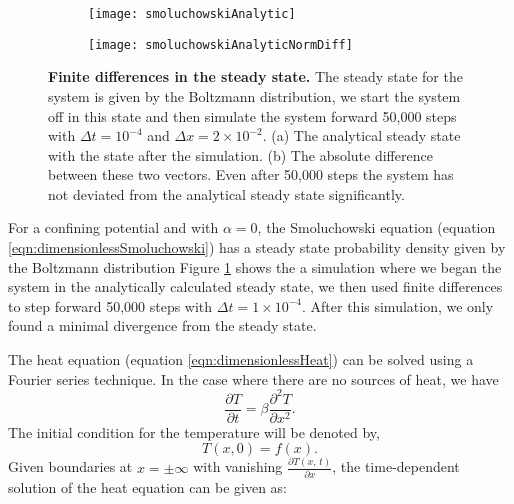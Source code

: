\begin{figure}
	\begin{subfigure}{0.49\textwidth}
	\texttt{[image: smoluchowskiAnalytic]}
	\end{subfigure}
	\begin{subfigure}{0.49\textwidth}
	\texttt{[image: smoluchowskiAnalyticNormDiff]}
	\end{subfigure}
	\caption{\textbf{Finite differences in the steady state.} The steady state for the system is given by the Boltzmann distribution, we start the system off in this state and then simulate the system forward 50,000 steps with $\Delta t = 10^{-4}$ and $\Delta x = 2 \times 10^{-2}$. (a) The analytical steady state with the state after the simulation. (b) The absolute difference between these two vectors. Even after 50,000 steps the system has not deviated from the analytical steady state significantly. \label{fig:smoluchowskiCompare}}
\end{figure}

For a confining potential and with $\alpha = 0$, the Smoluchowski equation (equation \ref{eqn:dimensionlessSmoluchowski}) has a steady state probability density given by the Boltzmann distribution
Figure \ref{fig:smoluchowskiCompare} shows the a simulation where we began the system in the analytically calculated steady state, we then used finite differences to step forward 50,000 steps with $\Delta t = 1 \times 10^{-4}$. After this simulation, we only found a minimal divergence from the steady state.

The heat equation (equation \ref{eqn:dimensionlessHeat}) can be solved using a Fourier series technique. In the case where there are no sources of heat, we have
\begin{equation}
\frac{\partial T}{\partial t} = \beta \frac{\partial^2 T}{\partial x^2}.
\end{equation}
The initial condition for the temperature will be denoted by,
\begin{equation}
T(x, 0) = f(x).
\end{equation}
Given boundaries at $x=\pm \infty$ with vanishing $\frac{\partial T(x, \, t)}{\partial x}$, the time-dependent solution of the heat equation can be given as:


